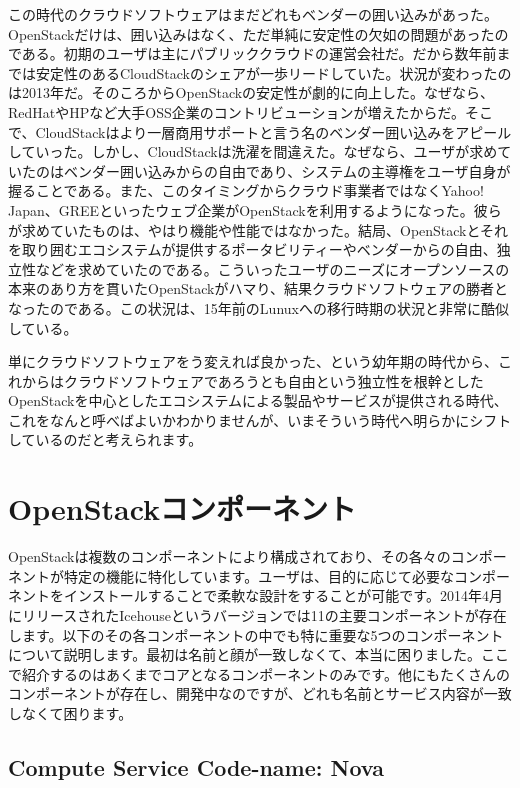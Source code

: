 \documentclass[9pt,b5paper,tombo,openany,dvipdfmx]{jsbook}
\begin{document}
この時代のクラウドソフトウェアはまだどれもベンダーの囲い込みがあった。OpenStackだけは、囲い込みはなく、ただ単純に安定性の欠如の問題があったのである。初期のユーザは主にパブリッククラウドの運営会社だ。だから数年前までは安定性のあるCloudStackのシェアが一歩リードしていた。状況が変わったのは2013年だ。そのころからOpenStackの安定性が劇的に向上した。なぜなら、RedHatやHPなど大手OSS企業のコントリビューションが増えたからだ。そこで、CloudStackはより一層商用サポートと言う名のベンダー囲い込みをアピールしていった。しかし、CloudStackは洗濯を間違えた。なぜなら、ユーザが求めていたのはベンダー囲い込みからの自由であり、システムの主導権をユーザ自身が握ることである。また、このタイミングからクラウド事業者ではなくYahoo! Japan、GREEといったウェブ企業がOpenStackを利用するようになった。彼らが求めていたものは、やはり機能や性能ではなかった。結局、OpenStackとそれを取り囲むエコシステムが提供するポータビリティーやベンダーからの自由、独立性などを求めていたのである。こういったユーザのニーズにオープンソースの本来のあり方を貫いたOpenStackがハマり、結果クラウドソフトウェアの勝者となったのである。この状況は、15年前のLunuxへの移行時期の状況と非常に酷似している。

単にクラウドソフトウェアをう変えれば良かった、という幼年期の時代から、これからはクラウドソフトウェアであろうとも自由という独立性を根幹としたOpenStackを中心としたエコシステムによる製品やサービスが提供される時代、これをなんと呼べばよいかわかりませんが、いまそういう時代へ明らかにシフトしているのだと考えられます。

\section{OpenStackコンポーネント}

OpenStackは複数のコンポーネントにより構成されており、その各々のコンポーネントが特定の機能に特化しています。ユーザは、目的に応じて必要なコンポーネントをインストールすることで柔軟な設計をすることが可能です。2014年4月にリリースされたIcehouseというバージョンでは11の主要コンポーネントが存在します。以下のその各コンポーネントの中でも特に重要な5つのコンポーネントについて説明します。最初は名前と顔が一致しなくて、本当に困りました。ここで紹介するのはあくまでコアとなるコンポーネントのみです。他にもたくさんのコンポーネントが存在し、開発中なのですが、どれも名前とサービス内容が一致しなくて困ります。

\subsection{Compute Service Code-name: Nova}
\end{document}
